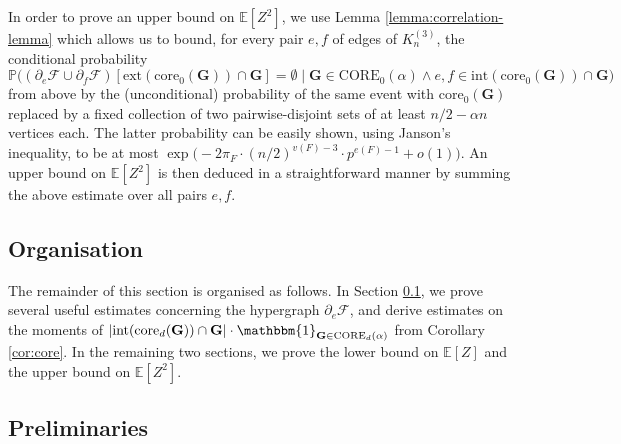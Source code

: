 \documentclass[11pt,a4paper,oneside,reqno]{amsart}
\newcommand{\bG}{\mathbf{G}}
\newcommand{\cF}{\mathcal{F}}
\renewcommand{\Pr}{\mathbb{P}}
\newcommand{\Ex}{\mathbb{E}}
\newcommand{\1}{\mathbbm{1}} %
\newcommand{\ext}{\mathrm{ext}}
\renewcommand{\int}{\mathrm{int}}
\newcommand{\core}{\mathrm{core}}
\newcommand{\Core}{\mathrm{CORE}}
\begin{document}
In order to prove an upper bound on $\Ex[Z^2]$, we use Lemma \ref{lemma:correlation-lemma} which allows us to bound, for every pair $e, f$ of edges of $K_n^{(3)}$, the conditional probability
\[
  \Pr\big((\partial_e\cF \cup \partial_f\cF)[\ext(\core_0(\bG)) \cap \bG] = \emptyset \mid \bG \in \Core_0(\alpha) \wedge e,f \in \int(\core_0(\bG)) \cap \bG\big)
\]
from above by the (unconditional) probability of the same event with $\core_0(\bG)$ replaced by a fixed collection of two pairwise-disjoint sets of at least $n/2 - \alpha n$ vertices each.  The latter probability can be easily shown, using Janson's inequality, to be at most $\exp\big(-2\pi_F \cdot (n/2)^{v(F)-3} \cdot p^{e(F)-1} + o(1)\big)$.  An upper bound on $\Ex[Z^2]$ is then deduced in a straightforward manner by summing the above estimate over all pairs $e, f$.

\subsection*{Organisation}

The remainder of this section is organised as follows.  In Section \ref{sec:preliminaries}, we prove several useful estimates concerning the hypergraph $\partial_e\cF$, and derive estimates on the moments of $|\int(\core_d(\bG)) \cap \bG| \cdot \1_{\bG \in \Core_d(\alpha)}$ from Corollary \ref{cor:core}.  In the remaining two sections, we prove the lower bound on $\Ex[Z]$ and the upper bound on $\Ex[Z^2]$.


\subsection{Preliminaries}
\label{sec:preliminaries}
\end{document}
